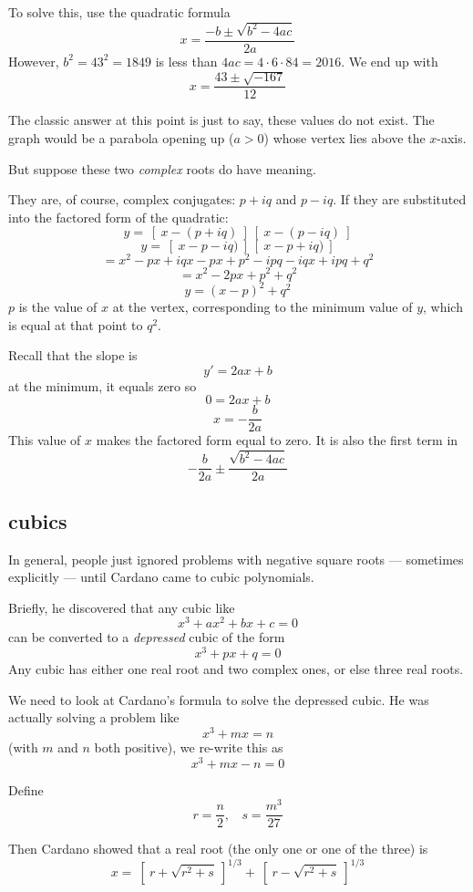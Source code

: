 \documentclass[11pt, oneside]{article}
\begin{document}
To solve this, use the quadratic formula
\[ x = \frac{-b \pm \sqrt{b^2 - 4ac}}{2a} \]
However, $b^2 = 43^2 = 1849$ is less than $4ac = 4 \cdot 6 \cdot 84 = 2016$.  We end up with
\[ x = \frac{43 \pm \sqrt{-167}}{12} \]

The classic answer at this point is just to say, these values do not exist.  The graph would be a parabola opening up ($a > 0$) whose vertex lies above the $x$-axis.

But suppose these two \emph{complex} roots do have meaning.

They are, of course, complex conjugates:  $p + iq$ and $p - iq$.  If they are substituted into the factored form of the quadratic:
\[ y = \ [ \ x - (p + iq) \ ] \ [ \ x - (p - iq) \ ] \]
\[ y = \ [ \ x - p - iq) \ ] \ [ \ x - p + iq) \ ] \]
\[ = x^2 - px + iqx - px + p^2 - ipq - iqx + ipq + q^2 \] 
\[ = x^2 - 2px + p^2 + q^2 \]
\[ y = (x-p)^2 + q^2 \]
$p$ is the value of $x$ at the vertex, corresponding to the minimum value of $y$, which is equal at that point to $q^2$.

Recall that the slope is
\[ y' = 2ax + b \]
at the minimum, it equals zero so
\[ 0 = 2ax + b \]
\[ x = -\frac{b}{2a} \]
This value of $x$ makes the factored form equal to zero.  It is also the first term in
\[ -\frac{b}{2a} \pm \frac{\sqrt{b^2 - 4ac}}{2a} \]

\subsection*{cubics}

In general, people just ignored problems with negative square roots  --- sometimes explicitly ---  until Cardano came to cubic polynomials.  

Briefly, he discovered that any cubic like
\[ x^3 + ax^2 + bx + c = 0 \]
can be converted to a \emph{depressed} cubic of the form
\[ x^3 + px + q = 0 \]
Any cubic has either one real root and two complex ones, or else three real roots.  

We need to look at Cardano's formula to solve the depressed cubic.  He was actually solving a problem like
\[ x^3 + mx = n \]
(with $m$ and $n$ both positive), we re-write this as
\[ x^3 + mx - n = 0 \]

Define
\[ r = \frac{n}{2}, \ \ \ \  s = \frac{m^3}{27} \]

Then Cardano showed that a real root (the only one or one of the three) is
\[ x = \ [ \ r + \sqrt{r^2 + s} \ ]^{1/3} + \ [ \ r - \sqrt{r^2 + s} \ ]^{1/3} \]
\end{document}
